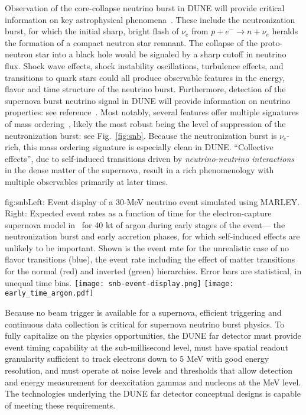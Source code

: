 Observation of the core-collapse neutrino burst in DUNE
will provide critical information on key
astrophysical phenomena~\cite{Mirizzi:2015eza}.  These include the neutronization burst, for which the initial sharp, bright flash
of $\nu_e$ from  $p+e^- \rightarrow n + \nu_e$
heralds the formation of a compact neutron star remnant.
The collapse of the proto-neutron star into a black hole would be signaled by a sharp cutoff in neutrino flux.
Shock wave effects, shock instability oscillations, turbulence effects, and transitions to quark stars could all produce observable features in the energy, flavor and time structure of the neutrino burst.
Furthermore, detection of the supernova burst 
neutrino signal in DUNE will provide information on neutrino properties: see reference~\cite{Mirizzi:2015eza}.  Most notably, several features offer multiple signatures of mass ordering~\cite{Scholberg:2017czd}, likely the most robust being the level of suppression of the  neutronization burst: see Fig.~\ref{fig:snb}.  Because the neutronization burst is $\nu_e$-rich, this mass ordering signature is especially clean in DUNE.
``Collective effects'', due to self-induced transitions driven by \textit{neutrino-neutrino interactions} in the dense matter of the supernova, result in a rich phenomenology with multiple observables primarily at later times.  


\begin{dunefigure}{fig:snb}{Left: Event display of a 30-MeV neutrino event simulated using MARLEY. Right: Expected event rates as a function of time for the electron-capture supernova model in~\cite{Huedepohl:2009wh} for 40 kt of argon during early stages of the event--- the neutronization burst and early accretion phases, for which self-induced effects are unlikely to be important.  Shown is the event rate for the unrealistic case of no flavor transitions (blue), the event rate including the effect of matter transitions for the normal (red)  and inverted (green) hierarchies.  Error bars are statistical, in unequal time bins.}
\texttt{[image: snb-event-display.png]}
\texttt{[image: early\_time\_argon.pdf]}
\end{dunefigure}

Because no beam trigger is available for a supernova, efficient triggering and continuous data collection is critical for supernova neutrino burst physics. To fully capitalize on the physics opportunities, the DUNE far detector must provide event timing capability at the sub-millisecond level, must have spatial readout granularity sufficient to track electrons down to 5 MeV with good energy resolution, and must operate at noise levels and thresholds that allow detection and energy measurement for deexcitation gammas and nucleons at the MeV level.  The \lartpc technologies underlying the DUNE far detector conceptual designs is capable of meeting these requirements.

